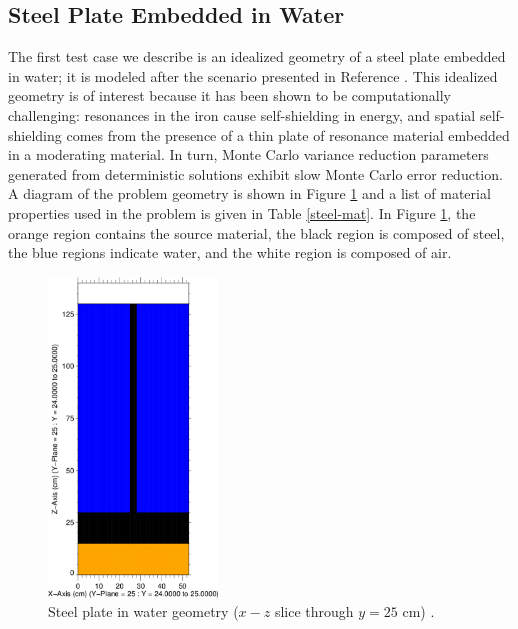 \documentclass{article} %
\begin{document}
\subsection{Steel Plate Embedded in Water}
\label{sec:steel_params}

The first test case we describe is an idealized geometry of a steel plate 
embedded in water; it is modeled after the scenario presented in Reference 
\cite{wilsonslaybaugh}. This idealized geometry is of interest because it has
been shown to be computationally challenging: resonances in the iron cause
self-shielding in energy, and spatial self-shielding comes from the presence
of a thin plate of resonance material embedded in a moderating material. In 
turn, Monte Carlo variance reduction parameters generated from deterministic
solutions exhibit slow Monte Carlo error reduction.
A diagram of the problem geometry is shown in Figure \ref{steelxz} and a list
of material properties used in the problem is given in Table \ref{steel-mat}.
In Figure \ref{steelxz}, the orange region contains the source material, the 
black region is composed of steel, the blue regions indicate water, and the 
white region is composed of air.

\begin{figure}[!htb]
\centering
\includegraphics[width=0.4\textwidth]{img/steel-xz.png}
\caption{Steel plate in water geometry ($x-z$ slice through $y = 25$ cm) 
         \cite{wilsonslaybaugh}.}
\label{steelxz}
\end{figure}
\end{document}
